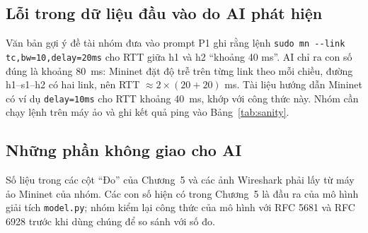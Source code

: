 \subsection{Lỗi trong dữ liệu đầu vào do AI phát hiện}
Văn bản gợi ý đề tài nhóm đưa vào prompt P1 ghi rằng lệnh \texttt{sudo mn -{}-link tc,bw=10,delay=20ms} cho RTT giữa h1 và h2 ``khoảng 40 ms''. AI chỉ ra con số đúng là khoảng 80~ms: Mininet đặt độ trễ trên từng link theo mỗi chiều, đường h1--s1--h2 có hai link, nên RTT $\approx 2 \times (20+20)$ ms. Tài liệu hướng dẫn Mininet có ví dụ \texttt{delay=10ms} cho RTT khoảng 40~ms, khớp với công thức này. Nhóm cần chạy lệnh trên máy ảo và ghi kết quả ping vào Bảng~\ref{tab:sanity}.

\subsection{Những phần không giao cho AI}
Số liệu trong các cột ``Đo'' của Chương~5 và các ảnh Wireshark phải lấy từ máy ảo Mininet của nhóm. Các con số hiện có trong Chương~5 là đầu ra của mô hình giải tích \texttt{model.py}; nhóm kiểm lại công thức của mô hình với RFC 5681 \cite{rfc5681} và RFC 6928 \cite{rfc6928} trước khi dùng chúng để so sánh với số đo.

\cleardoublepage
